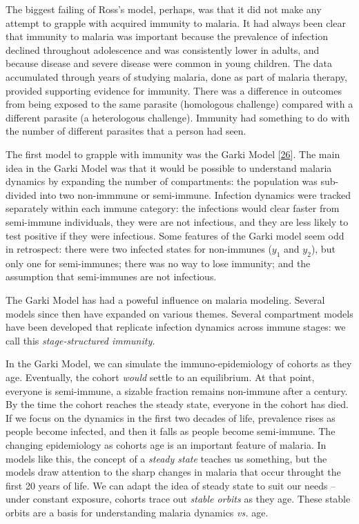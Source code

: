 \documentclass[
]{book}
\begin{document}
The biggest failing of Ross's model, perhaps, was that it did not make any attempt to grapple with acquired immunity to malaria. It had always been clear that immunity to malaria was important because the prevalence of infection declined throughout adolescence and was consistently lower in adults, and because disease and severe disease were common in young children. The data accumulated through years of studying malaria, done as part of malaria therapy, provided supporting evidence for immunity. There was a difference in outcomes from being exposed to the same parasite (homologous challenge) compared with a different parasite (a heterologous challenge). Immunity had something to do with the number of different parasites that a person had seen.

The first model to grapple with immunity was the Garki Model {[}\protect\hyperlink{ref-DietzK1974MalariaModel}{26}{]}. The main idea in the Garki Model was that it would be possible to understand malaria dynamics by expanding the number of compartments: the population was sub-divided into two non-immmune or semi-immune. Infection dynamics were tracked separately within each immune category: the infections would clear faster from semi-immune individuals, they were are not infectious, and they are less likely to test positive if they were infectious. Some features of the Garki model seem odd in retrospect: there were two infected states for non-immunes (\(y_1\) and \(y_2\)), but only one for semi-immunes; there was no way to lose immunity; and the assumption that semi-immunes are not infectious.

The Garki Model has had a poweful influence on malaria modeling. Several models since then have expanded on various themes. Several compartment models have been developed that replicate infection dynamics across immune stages: we call this \emph{stage-structured immunity.}

In the Garki Model, we can simulate the immuno-epidemiology of cohorts as they age. Eventually, the cohort \emph{would} settle to an equilibrium. At that point, everyone is semi-immune, a sizable fraction remains non-immune after a century. By the time the cohort reaches the steady state, everyone in the cohort has died. If we focus on the dynamics in the first two decades of life, prevalence rises as people become infected, and then it falls as people become semi-immune. The changing epidemiology as cohorts age is an important feature of malaria. In models like this, the concept of a \emph{steady state} teaches us something, but the models draw attention to the sharp changes in malaria that occur throught the first 20 years of life. We can adapt the idea of steady state to suit our needs -- under constant exposure, cohorts trace out \emph{stable orbits} as they age. These stable orbits are a basis for understanding malaria dynamics \emph{vs.} age.
\end{document}
